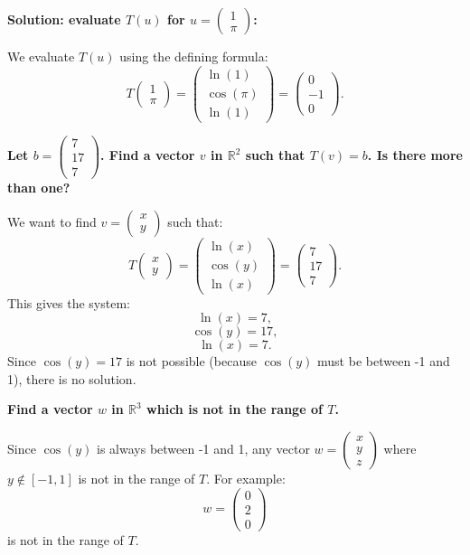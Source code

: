 \documentclass[a4paper,12pt]{article}
\begin{document}
\textbf{Solution: evaluate \( T(u) \) for \( u = \begin{pmatrix} 1 \\ \pi \end{pmatrix} \):}

We evaluate \( T(u) \) using the defining formula:
\[
T\begin{pmatrix} 1 \\ \pi \end{pmatrix} = \begin{pmatrix} \ln(1) \\ \cos(\pi) \\ \ln(1) \end{pmatrix} = \begin{pmatrix} 0 \\ -1 \\ 0 \end{pmatrix}.
\]

\textbf{Let \( b = \begin{pmatrix} 7 \\ 17 \\ 7 \end{pmatrix} \). Find a vector \( v \) in \( \mathbb{R}^2 \) such that \( T(v) = b \). Is there more than one?}

We want to find \( v = \begin{pmatrix} x \\ y \end{pmatrix} \) such that:
\[
T\begin{pmatrix} x \\ y \end{pmatrix} = \begin{pmatrix} \ln(x) \\ \cos(y) \\ \ln(x) \end{pmatrix} = \begin{pmatrix} 7 \\ 17 \\ 7 \end{pmatrix}.
\]
This gives the system:
\[
\ln(x) = 7,
\]
\[
\cos(y) = 17,
\]
\[
\ln(x) = 7.
\]
Since \( \cos(y) = 17 \) is not possible (because \( \cos(y) \) must be between -1 and 1), there is no solution.

\textbf{Find a vector \( w \) in \( \mathbb{R}^3 \) which is not in the range of \( T \).}

Since \( \cos(y) \) is always between -1 and 1, any vector \( w = \begin{pmatrix} x \\ y \\ z \end{pmatrix} \) where \( y \notin [-1, 1] \) is not in the range of \( T \). For example:
\[
w = \begin{pmatrix} 0 \\ 2 \\ 0 \end{pmatrix}
\]
is not in the range of \( T \).
\end{document}

